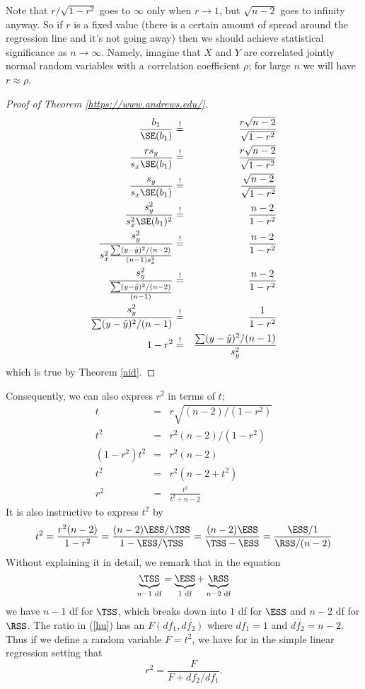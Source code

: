 Note that $r/\sqrt{1-r^2}$ goes to $\infty$ only when $r\to 1$, but $\sqrt{n-2}$ goes to infinity anyway. So if $r$ is a fixed value (there is a certain amount of spread around the regression line and it's not going away) then we should achieve statistical significance as $n\to \infty$. Namely, imagine that $X$ and $Y$ are correlated jointly normal random variables with a correlation coefficient $\rho$; for large $n$ we will have $r\approx\rho$.
\begin{proof}[Proof of Theorem \ref{https://www.andrews.edu/}]
	\begin{eqnarray*}
		\frac{b_1}{\SE(b_1)}										&\overset{!}{=}& \frac{r\sqrt{n-2}}{\sqrt{1-r^2}}\\
		\frac{r s_y}{s_x \SE(b_1)} 									&\overset{!}{=}& \frac{r\sqrt{n-2}}{\sqrt{1-r^2}}\\
		\frac{s_y}{s_x \SE(b_1)}									&\overset{!}{=}& \frac{\sqrt{n-2}}{\sqrt{1-r^2}}\\
		\frac{s_y^2}{s_x^2 \SE(b_1)^2}								&\overset{!}{=}& \frac{n-2}{1-r^2}\\
		\frac{s_y^2}{s_x^2 \frac{\sum(y-\hat y)^2/(n-2)}{(n-1)s_x^2}}		&\overset{!}{=}& \frac{n-2}{1-r^2}\\
		\frac{s_y^2}{\frac{\sum(y-\hat y)^2/(n-2)}{(n-1)}}					&\overset{!}{=}& \frac{n-2}{1-r^2}\\
		\frac{s_y^2}{\sum(y-\hat y)^2/(n-1)} 							&\overset{!}{=}& \frac{1}{1-r^2}\\
		1-r^2 												&\overset{!}{=}& \frac{\sum(y-\hat y)^2/(n-1)}{s_y^2}\\
	\end{eqnarray*}
which is true by Theorem \ref{aid}.
\end{proof}


Consequently, we can also express $r^2$ in terms of $t$;
\begin{eqnarray}
	t&=&r\sqrt{(n-2)/(1-r^2)}\\
\label{goat}	t^2&=&r^2(n-2)/(1-r^2)\\
	(1-r^2)t^2&=&r^2(n-2)\\
	t^2&=&r^2(n-2+t^2)\\
	r^2 &=& \frac{t^2}{t^2+n-2}
\end{eqnarray}
It is also instructive to express $t^2$ by
\begin{equation}\label{hu}
	t^2 = \frac{r^2(n-2)}{1-r^2} = \frac{(n-2)\ESS/\TSS}{1-\ESS/\TSS}=\frac{(n-2)\ESS}{\TSS-\ESS}%
	= \frac{\ESS/1}{\RSS/(n-2)}
\end{equation}
Without explaining it in detail, we remark that in the equation
\[
	\underbrace{\TSS}_{n-1 \text{ df}} = \underbrace{\ESS}_{1 \text{ df}} + \underbrace{\RSS}_{n-2 \text{ df}}
\]
we have $n-1$ df for $\TSS$, which breaks down into $1$ df for $\ESS$ and $n-2$ df for $\RSS$.
The ratio in (\ref{hu}) has an  $F(df_1,df_2)$ where $df_1=1$ and $df_2=n-2$.
Thus if we define a random variable $F=t^2$, we have for in the simple linear regression setting that
\[
r^2 = \frac{F}{F+df_2/df_1}.
\]

